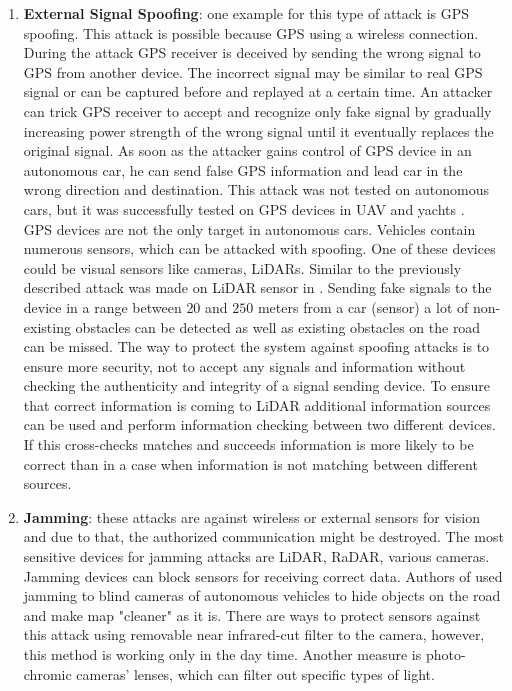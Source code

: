 \begin{enumerate}
	\item \textbf{External Signal Spoofing}: one example for this type of attack is \gls{GPS} spoofing. This attack is possible because \gls{GPS} using a wireless connection. During the attack \gls{GPS} receiver is deceived by sending the wrong signal to \gls{GPS} from another device. The incorrect signal may be similar to real \gls{GPS} signal or can be captured before and replayed at a certain time. An attacker can trick \gls{GPS} receiver to accept and recognize only fake signal by gradually increasing power strength of the wrong signal until it eventually replaces the original signal. As soon as the attacker gains control of \gls{GPS} device in an autonomous car, he can send false \gls{GPS} information and lead car in the wrong direction and destination. This attack was not tested on autonomous cars, but it was successfully tested on \gls{GPS} devices in \gls{UAV} and yachts \cite{Spoof2, IIIspoof}. \\
	\gls{GPS} devices are not the only target in autonomous cars. Vehicles contain numerous sensors, which can be attacked with spoofing. One of these devices could be visual sensors like cameras, \glspl{LiDAR}. Similar to the previously described attack was made on \gls{LiDAR} sensor in \cite{AttacksOnSensors}. Sending fake signals to the device in a range between $20$ and $250$ meters from a car (sensor) a lot of non-existing obstacles can be detected as well as existing obstacles on the road can be missed. 
	The way to protect the system against spoofing attacks is to ensure more security, not to accept any signals and information without checking the authenticity and integrity of a signal sending device. To ensure that correct information is coming to \gls{LiDAR} additional information sources can be used and perform information checking between two different devices. If this cross-checks matches and succeeds information is more likely to be correct than in a case when information is not matching between different sources.
	\item \textbf{Jamming}: these attacks are against wireless or external sensors for vision and due to that, the authorized communication might be destroyed. The most sensitive devices for jamming attacks are \gls{LiDAR}, \gls{RaDAR}, various cameras. Jamming devices can block sensors for receiving correct data. Authors of \cite{AttacksOnSensors} used jamming to blind cameras of autonomous vehicles to hide objects on the road and make map "cleaner" as it is. There are ways to protect sensors against this attack using removable near infrared-cut filter to the camera, however, this method is working only in the day time. Another measure is photo-chromic cameras' lenses, which can filter out specific types of light.
\end{enumerate} 


